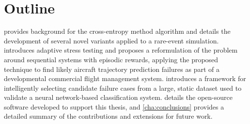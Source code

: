 \section{Outline}
 provides background for the cross-entropy method algorithm and details the development of several novel variants applied to a rare-event simulation.
 introduces adaptive stress testing and proposes a reformulation of the problem around sequential systems with episodic rewards, applying the proposed technique to find likely aircraft trajectory prediction failures as part of a developmental commercial flight management system.
 introduces a framework for intelligently selecting candidate failure cases from a large, static dataset used to validate a neural network-based classification system.
 details the open-source software developed to support this thesis, and \cref{cha:conclusions} provides a detailed summary of the contributions and extensions for future work.
